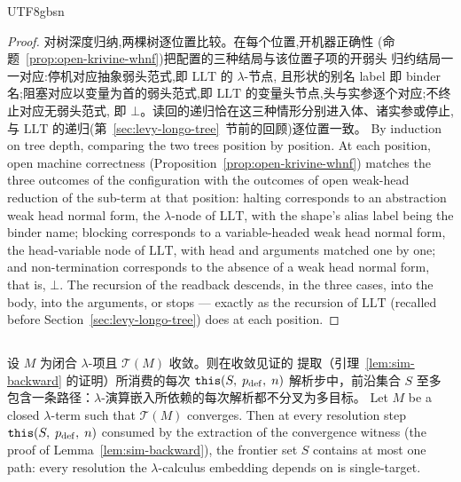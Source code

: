 \begin{CJK*}{UTF8}{gbsn}
\begin{proof}
\ifPaperChinese
  对树深度归纳,两棵树逐位置比较。在每个位置,开机器正确性
  (命题~\ref{prop:open-krivine-whnf})把配置的三种结局与该位置子项的开弱头
  归约结局一一对应:停机对应抽象弱头范式,即 $\mathrm{LLT}$ 的 $\lambda$-节点,
  且形状的别名 label 即 binder 名;阻塞对应以变量为首的弱头范式,即
  $\mathrm{LLT}$ 的变量头节点,头与实参逐个对应;不终止对应无弱头范式,
  即 $\bot$。读回的递归恰在这三种情形分别进入体、诸实参或停止,
  与 $\mathrm{LLT}$ 的递归(第~\ref{sec:levy-longo-tree}~节前的回顾)逐位置一致。
\else
  By induction on tree depth, comparing the two trees position by
  position. At each position, open machine correctness
  (Proposition~\ref{prop:open-krivine-whnf}) matches the three
  outcomes of the configuration with the outcomes of open weak-head
  reduction of the sub-term at that position: halting corresponds to
  an abstraction weak head normal form, the $\lambda$-node of
  $\mathrm{LLT}$, with the shape's alias label being the binder name;
  blocking corresponds to a variable-headed weak head normal form,
  the head-variable node of $\mathrm{LLT}$, with head and arguments
  matched one by one; and non-termination corresponds to the absence
  of a weak head normal form, that is, $\bot$. The recursion of the
  readback descends, in the three cases, into the body, into the
  arguments, or stops --- exactly as the recursion of
  $\mathrm{LLT}$ (recalled before
  Section~\ref{sec:levy-longo-tree}) does at each position.
\fi
\end{proof}

\subsection{}

\begin{lemma}\label{lem:single-path}
  \ifPaperChinese
  设 $M$ 为闭合 $\lambda$-项且 $\mathcal{T}(M)$ 收敛。则在收敛见证的
  提取（引理~\ref{lem:sim-backward} 的证明）所消费的每次
  $\mathtt{this}(S,\; p_{\mathrm{def}},\; n)$ 解析步中，前沿集合 $S$ 至多
  包含一条路径：$\lambda$-演算嵌入所依赖的每次解析都不分叉为多目标。
  \else
  Let $M$ be a closed $\lambda$-term such that $\mathcal{T}(M)$
  converges. Then at every resolution step
  $\mathtt{this}(S,\; p_{\mathrm{def}},\; n)$ consumed by the extraction of
  the convergence witness (the proof of
  Lemma~\ref{lem:sim-backward}), the frontier set $S$ contains at
  most one path: every resolution the $\lambda$-calculus embedding
  depends on is single-target.
  \fi
\end{lemma}


\end{CJK*}
